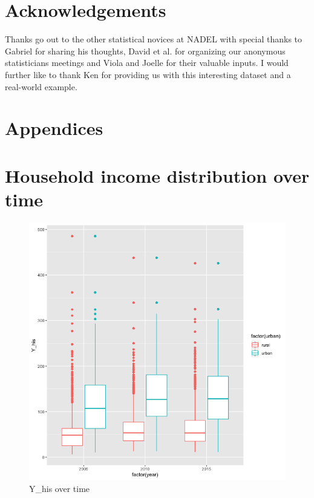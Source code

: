 \documentclass[a4paper, 11pt]{article} %
\begin{document}
\section{Acknowledgements}
Thanks go out to the other statistical novices at NADEL with special thanks to Gabriel for sharing his thoughts, David et al. for organizing our anonymous statisticians meetings and Viola and Joelle for their valuable inputs. I would further like to thank Ken for providing us with this interesting dataset and a real-world example.


\newpage




\newpage
\section*{Appendices}
\appendix
\section{Household income distribution over time} \label{sec:appendix_household_dist}
\begin{figure}[h!]
    \centering
    \includegraphics[scale=0.5]{figures/income_over_time} 
    \caption{Y\_his over time}
    \label{fig:income_over_time}
\end{figure}
\end{document}
